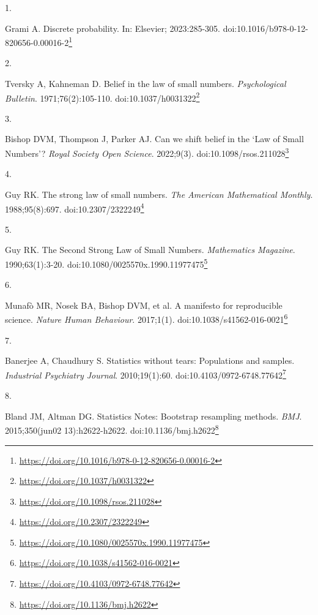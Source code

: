 \documentclass[
  a4paper,
]{book}
\newlength{\cslhangindent}
\newlength{\csllabelwidth}
\newlength{\cslentryspacingunit} %
\newenvironment{CSLReferences}[2] %
 {%
  \setlength{\parindent}{0pt}
  \ifodd #1
  \let\oldpar\par
  \def\par{\hangindent=\cslhangindent\oldpar}
  \fi
  \setlength{\parskip}{#2\cslentryspacingunit}
 }%
 {}
\newcommand{\CSLLeftMargin}[1]{\parbox[t]{\csllabelwidth}{#1}}
\newcommand{\CSLRightInline}[1]{\parbox[t]{\linewidth - \csllabelwidth}{#1}\break}
\renewcommand{\href}[2]{#2\footnote{\url{#1}}}
\begin{document}
\hypertarget{refs}{}
\begin{CSLReferences}{0}{0}
\leavevmode{}%
\CSLLeftMargin{1. }%
\CSLRightInline{Grami A. Discrete probability. In: Elsevier; 2023:285-305. doi:\href{https://doi.org/10.1016/b978-0-12-820656-0.00016-2}{10.1016/b978-0-12-820656-0.00016-2}}

\leavevmode{}%
\CSLLeftMargin{2. }%
\CSLRightInline{Tversky A, Kahneman D. Belief in the law of small numbers. \emph{Psychological Bulletin}. 1971;76(2):105-110. doi:\href{https://doi.org/10.1037/h0031322}{10.1037/h0031322}}

\leavevmode{}%
\CSLLeftMargin{3. }%
\CSLRightInline{Bishop DVM, Thompson J, Parker AJ. Can we shift belief in the {`}Law of Small Numbers{'}? \emph{Royal Society Open Science}. 2022;9(3). doi:\href{https://doi.org/10.1098/rsos.211028}{10.1098/rsos.211028}}

\leavevmode{}%
\CSLLeftMargin{4. }%
\CSLRightInline{Guy RK. The strong law of small numbers. \emph{The American Mathematical Monthly}. 1988;95(8):697. doi:\href{https://doi.org/10.2307/2322249}{10.2307/2322249}}

\leavevmode{}%
\CSLLeftMargin{5. }%
\CSLRightInline{Guy RK. The Second Strong Law of Small Numbers. \emph{Mathematics Magazine}. 1990;63(1):3-20. doi:\href{https://doi.org/10.1080/0025570x.1990.11977475}{10.1080/0025570x.1990.11977475}}

\leavevmode{}%
\CSLLeftMargin{6. }%
\CSLRightInline{Munafò MR, Nosek BA, Bishop DVM, et al. A manifesto for reproducible science. \emph{Nature Human Behaviour}. 2017;1(1). doi:\href{https://doi.org/10.1038/s41562-016-0021}{10.1038/s41562-016-0021}}

\leavevmode{}%
\CSLLeftMargin{7. }%
\CSLRightInline{Banerjee A, Chaudhury S. Statistics without tears: Populations and samples. \emph{Industrial Psychiatry Journal}. 2010;19(1):60. doi:\href{https://doi.org/10.4103/0972-6748.77642}{10.4103/0972-6748.77642}}

\leavevmode{}%
\CSLLeftMargin{8. }%
\CSLRightInline{Bland JM, Altman DG. Statistics Notes: Bootstrap resampling methods. \emph{BMJ}. 2015;350(jun02 13):h2622-h2622. doi:\href{https://doi.org/10.1136/bmj.h2622}{10.1136/bmj.h2622}}


\end{CSLReferences}
\end{document}
